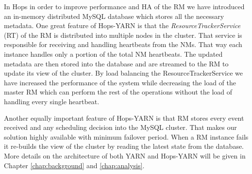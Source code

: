 In Hops in order to improve performance and HA of the RM we have introduced an
in-memory distributed MySQL database which stores all the necessary
metadata. One great feature of Hops-YARN is that the
\emph{ResourceTrackerService} (RT) of the RM is distributed into multiple
nodes in the cluster. That service is responsible for receiving and handling
heartbeats from the NMs. That way each instance handles only a portion of the total NM
heartbeats. The updated metadata are then stored into the database and
are streamed to the RM to update its view of the cluster. By load
balancing the ResourceTrackerService we have increased the performance
of the system while decreasing the load of the master RM which can
perform the rest of the operations without the load of handling every
single heartbeat.

Another equally important feature of Hops-YARN is that RM stores
every event received and any scheduling decision into the MySQL
cluster. That makes our solution highly available with minimum
failover period. When a RM instance fails it re-builds the view of the
cluster by reading the latest state from the database. More details on
the architecture of both YARN and Hops-YARN will be given in Chapter
\ref{chap:background} and \ref{chap:analysis}.